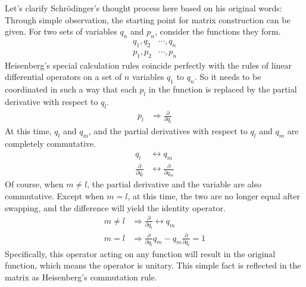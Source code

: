 \documentclass[a4paper, 12pt, oneside, onecolumn]{article}
\begin{document}
\begin{multicols}{2}
Let's clarify Schrödinger's thought process here based on his original words: Through simple observation, the starting point for matrix construction can be given. For two sets of variables $q_n$ and $p_n$, consider the functions they form.
\begin{align}
	q_1, q_2
	&\cdots, q_n \\
	p_1, p_2
	&\cdots, p_n
\end{align}
Heisenberg's special calculation rules coincide perfectly with the rules of linear differential operators on a set of $n$ variables $q_1$ to $q_n$. So it needs to be coordinated in such a way that each $p_l$ in the function is replaced by the partial derivative with respect to $q_l$.
\begin{align}
	p_l
	&\Rightarrow \frac{\partial}{\partial q_l}
\end{align}
At this time, $q_l$ and $q_m$, and the partial derivatives with respect to $q_l$ and $q_m$ are completely commutative.
\begin{align}
	q_l
	&\longleftrightarrow q_m \\
	\frac{\partial}{\partial q_l}
	&\longleftrightarrow \frac{\partial}{\partial q_m}
\end{align}
Of course, when $m \neq l$, the partial derivative and the variable are also commutative. Except when $m = l$, at this time, the two are no longer equal after swapping, and the difference will yield the identity operator.
\begin{align}
	m \neq l
	&\Rightarrow \frac{\partial}{\partial q_l} \longleftrightarrow q_m \\
	m = l
	&\Rightarrow \frac{\partial}{\partial q_l} q_m - q_m \frac{\partial}{\partial q_l} = 1
\end{align}
Specifically, this operator acting on any function will result in the original function, which means the operator is unitary. This simple fact is reflected in the matrix as Heisenberg's commutation rule.


\end{multicols}
\end{document}
